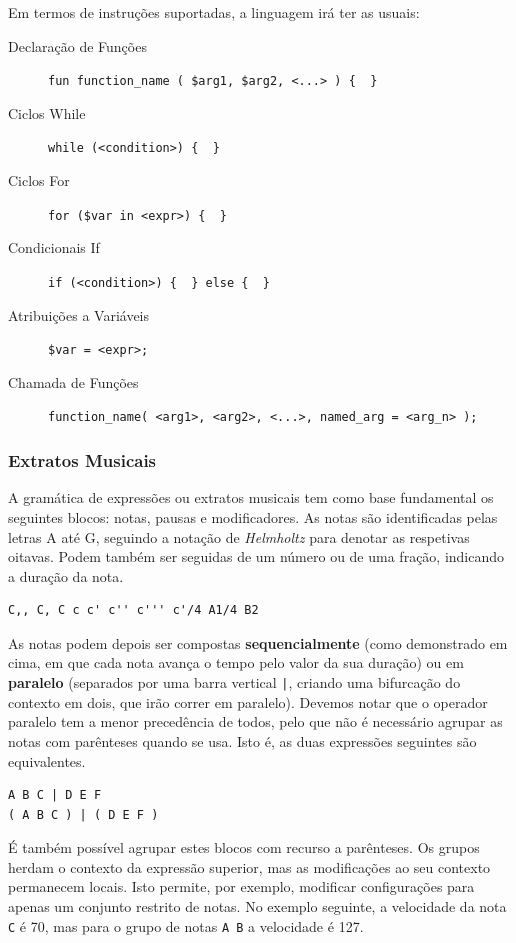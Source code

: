 Em termos de instruções suportadas, a linguagem irá ter as usuais:
\begin{description}
    \item[Declaração de Funções] \verb|fun function_name ( $arg1, $arg2, <...> ) {  }|
    \item[Ciclos While] \verb|while (<condition>) {  }|
    \item[Ciclos For] \verb|for ($var in <expr>) {  }|
    \item[Condicionais If] \verb|if (<condition>) {  } else {  }|
    \item[Atribuições a Variáveis] \verb|$var = <expr>;|
    \item[Chamada de Funções] \verb|function_name( <arg1>, <arg2>, <...>, named_arg = <arg_n> );|
\end{description}

\subsubsection{Extratos Musicais}
A gramática de expressões ou extratos musicais tem como base fundamental os seguintes blocos: notas, pausas e modificadores. As notas são identificadas pelas letras A até G, seguindo a notação de \textit{Helmholtz}\citep{helmholtz-pitch-notation} para denotar as respetivas oitavas. Podem também ser seguidas de um número ou de uma fração, indicando a duração da nota.

\begin{lstlisting}[caption={Exemplos de notas}]
C,, C, C c c' c'' c''' c'/4 A1/4 B2
\end{lstlisting}


As notas podem depois ser compostas \textbf{sequencialmente} (como demonstrado em cima, em que cada nota avança o tempo pelo valor da sua duração) ou em \textbf{paralelo} (separados por uma barra vertical \texttt{|}, criando uma bifurcação do contexto em dois, que irão correr em paralelo). Devemos notar que o operador paralelo tem a menor precedência de todos, pelo que não é necessário agrupar as notas com parênteses quando se usa. Isto é, as duas expressões seguintes são equivalentes.

\begin{lstlisting}
A B C | D E F
( A B C ) | ( D E F )
\end{lstlisting}

É também possível agrupar estes blocos com recurso a parênteses. Os grupos herdam o contexto da expressão superior, mas as modificações ao seu contexto permanecem locais. Isto permite, por exemplo, modificar configurações para apenas um conjunto restrito de notas. No exemplo seguinte, a velocidade da nota \texttt{C} é 70, mas para o grupo de notas \texttt{A B} a velocidade é 127.

